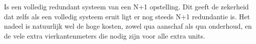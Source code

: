 Is een volledig redundant systeem van een N+1 opstelling. Dit geeft de zekerheid dat zelfs als een volledig systeem eruit ligt er nog steeds N+1 redundantie is. Het nadeel is natuurlijk wel de hoge kosten, zowel qua aanschaf als qua onderhoud, en de vele extra vierkantenmeters die nodig zijn voor alle extra units.

